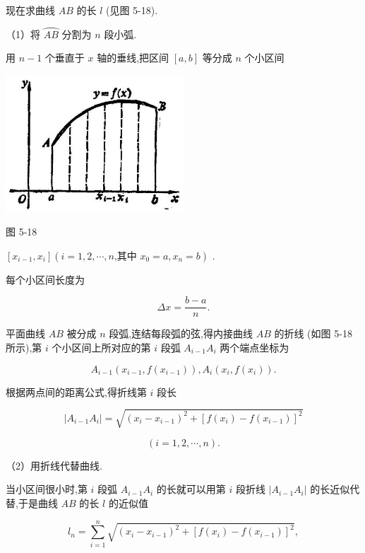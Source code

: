 \documentclass[lang=cn,newtx,10pt,scheme=chinese]{elegantbook}
\begin{document}
现在求曲线 \({AB}\) 的长 \(l\) (见图 5-18).

（1）将 \(\overset{⏜}{AB}\) 分割为 \(n\) 段小弧.

用 \(n - 1\) 个垂直于 \(x\) 轴的垂线,把区间 \(\left\lbrack {a,b}\right\rbrack\) 等分成 \(n\) 个小区间

\begin{center}
\includegraphics[max width=0.5\textwidth]{images/01912c18-5c3f-733d-b775-749ba9897a9d_240_926911.jpg}
\end{center}

图 5-18

\(\left\lbrack {{x}_{i - 1},{x}_{i}}\right\rbrack \left( {i = 1,2,\cdots ,n\text{,其中 }{x}_{0} = a,{x}_{n} = b}\right)\) .

每个小区间长度为

\[
{\Delta x} = \frac{b - a}{n}.
\]

平面曲线 \({AB}\) 被分成 \(n\) 段弧,连结每段弧的弦,得内接曲线 \({AB}\) 的折线 (如图 5-18 所示),第 \(i\) 个小区间上所对应的第 \(i\) 段弧 \({A}_{i - 1}{A}_{i}\) 两个端点坐标为

\[
{A}_{i - 1}\left( {{x}_{i - 1},f\left( {x}_{i - 1}\right) }\right) ,{A}_{i}\left( {{x}_{i},f\left( {x}_{i}\right) }\right) .
\]

根据两点间的距离公式,得折线第 \(i\) 段长

\[
\left| {{A}_{i - 1}{A}_{i}}\right| = \sqrt{{\left( {x}_{i} - {x}_{i - 1}\right) }^{2} + {\left\lbrack f\left( {x}_{i}\right) - f\left( {x}_{i - 1}\right) \right\rbrack }^{2}}
\]

\[
\left( {i = 1,2,\cdots ,n}\right) \text{.}
\]

（2）用折线代替曲线.

当小区间很小时,第 \(i\) 段弧 \({A}_{i - 1}{A}_{i}\) 的长就可以用第 \(i\) 段折线 \(\left| {{A}_{i - 1}{A}_{i}}\right|\) 的长近似代替,于是曲线 \({AB}\) 的长 \(l\) 的近似值

\[
{l}_{n} = \mathop{\sum }\limits_{{i = 1}}^{n}\sqrt{{\left( {x}_{i} - {x}_{i - 1}\right) }^{2} + {\left\lbrack f\left( {x}_{i}\right) - f\left( {x}_{i - 1}\right) \right\rbrack }^{2}}, \tag{1}
\]
\end{document}
